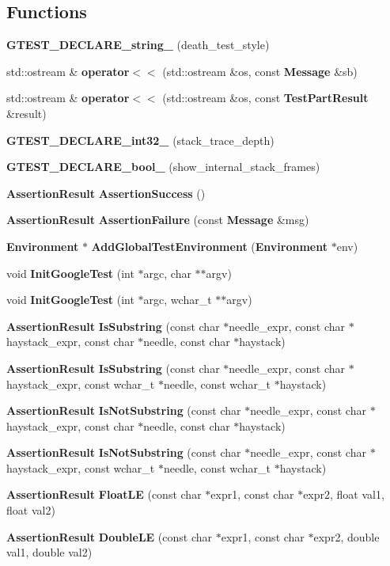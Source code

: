 \subsection*{Functions}
\begin{CompactItemize}
\item 
{\bf GTEST\_\-DECLARE\_\-string\_\-} (death\_\-test\_\-style)
\item 
std::ostream \& {\bf operator$<$$<$} (std::ostream \&os, const {\bf Message} \&sb)
\item 
std::ostream \& {\bf operator$<$$<$} (std::ostream \&os, const {\bf TestPartResult} \&result)
\item 
{\bf GTEST\_\-DECLARE\_\-int32\_\-} (stack\_\-trace\_\-depth)
\item 
{\bf GTEST\_\-DECLARE\_\-bool\_\-} (show\_\-internal\_\-stack\_\-frames)
\item 
{\bf AssertionResult} {\bf AssertionSuccess} ()
\item 
{\bf AssertionResult} {\bf AssertionFailure} (const {\bf Message} \&msg)
\item 
{\bf Environment} $\ast$ {\bf AddGlobalTestEnvironment} ({\bf Environment} $\ast$env)
\item 
void {\bf InitGoogleTest} (int $\ast$argc, char $\ast$$\ast$argv)
\item 
void {\bf InitGoogleTest} (int $\ast$argc, wchar\_\-t $\ast$$\ast$argv)
\item 
{\bf AssertionResult} {\bf IsSubstring} (const char $\ast$needle\_\-expr, const char $\ast$haystack\_\-expr, const char $\ast$needle, const char $\ast$haystack)
\item 
{\bf AssertionResult} {\bf IsSubstring} (const char $\ast$needle\_\-expr, const char $\ast$haystack\_\-expr, const wchar\_\-t $\ast$needle, const wchar\_\-t $\ast$haystack)
\item 
{\bf AssertionResult} {\bf IsNotSubstring} (const char $\ast$needle\_\-expr, const char $\ast$haystack\_\-expr, const char $\ast$needle, const char $\ast$haystack)
\item 
{\bf AssertionResult} {\bf IsNotSubstring} (const char $\ast$needle\_\-expr, const char $\ast$haystack\_\-expr, const wchar\_\-t $\ast$needle, const wchar\_\-t $\ast$haystack)
\item 
{\bf AssertionResult} {\bf FloatLE} (const char $\ast$expr1, const char $\ast$expr2, float val1, float val2)
\item 
{\bf AssertionResult} {\bf DoubleLE} (const char $\ast$expr1, const char $\ast$expr2, double val1, double val2)
\end{CompactItemize}
